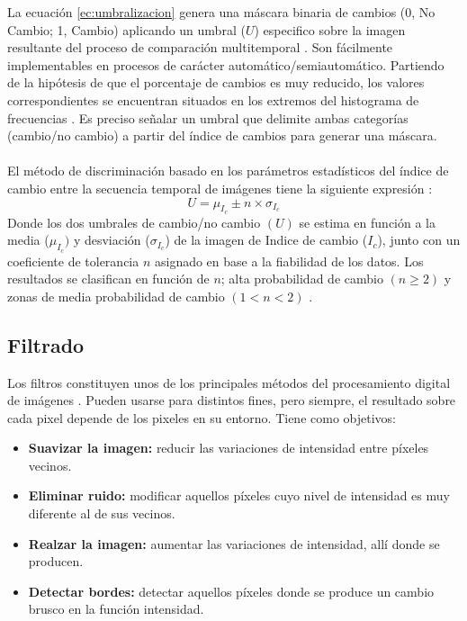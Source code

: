 La ecuaci\'on \ref{ec:umbralizacion} genera una m\'ascara binaria de cambios (0, No Cambio; 1, Cambio) aplicando un umbral ($ U $) especifico sobre la imagen resultante del proceso de comparaci\'on multitemporal \cite{singh1989review}. Son f\'acilmente implementables en procesos de car\'acter autom\'atico/semiautom\'atico. Partiendo de la hip\'otesis de que el porcentaje de cambios es muy reducido, los valores correspondientes se encuentran situados en los extremos del histograma de frecuencias \cite{estornell2004analisis}. Es preciso se\~{n}alar un umbral que delimite ambas categor\'ias (cambio/no cambio) a partir del \'indice de cambios \cite{radke2005image} para generar una m\'ascara.\\~\\
El m\'etodo de discriminaci\'on basado en los par\'ametros estad\'isticos del \'indice de cambio entre la secuencia temporal de im\'agenes tiene la siguiente expresi\'on \cite{rodriguez2010analisis}:
\begin{equation}
U=\mu_{I_{c}} \pm n \times \sigma _{I_{c}}
\end{equation}
Donde los dos umbrales de cambio/no cambio $ (U) $ se estima en funci\'on a la media ($ \mu_{I_{c}}) $ y desviaci\'on ($ \sigma_{I_{c}} $) de la imagen de Indice de cambio ($ I_{c} $), junto con un coeficiente de tolerancia $ n $ asignado en base a la fiabilidad de los datos. Los resultados se clasifican en funci\'on de $ n $; alta probabilidad de cambio $ (n \geq 2) $ y
zonas de media probabilidad de cambio $ (1 < n < 2) $ \cite{estornell2004analisis}. 
\subsection{Filtrado}
Los filtros constituyen unos de los principales m\'etodos del procesamiento digital de im\'agenes . Pueden usarse para distintos fines, pero siempre, el resultado sobre cada pixel depende de los pixeles en su entorno. Tiene como objetivos: 
	\begin{itemize}
		\item \textbf{Suavizar la imagen:} reducir las variaciones de intensidad entre p\'ixeles vecinos.
		\item \textbf{Eliminar ruido:}  modificar aquellos p\'ixeles cuyo nivel de intensidad es muy diferente al de sus vecinos.
		\item \textbf{Realzar la imagen:} aumentar las variaciones de intensidad, all\'i donde se producen.
		\item \textbf{Detectar bordes:} detectar aquellos p\'ixeles donde se produce un cambio brusco en la funci\'on intensidad.	
	\end{itemize}

